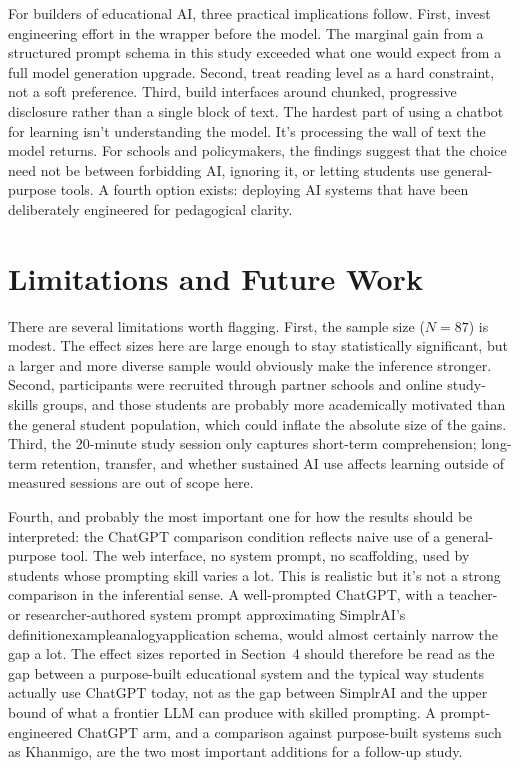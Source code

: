 \documentclass[11pt,letterpaper]{article}
\begin{document}
For builders of educational AI, three practical implications follow. First,
invest engineering effort in the wrapper before the model. The marginal gain
from a structured prompt schema in this study exceeded what one would expect
from a full model generation upgrade. Second, treat reading level as a hard
constraint, not a soft preference. Third, build interfaces around chunked,
progressive disclosure rather than a single block of text. The hardest part of
using a chatbot for learning isn't understanding the model. It's
processing the wall of text the model returns. For schools and policymakers,
the findings suggest that the choice need not be between forbidding AI, ignoring
it, or letting students use general-purpose tools. A fourth option exists:
deploying AI systems that have been deliberately engineered for pedagogical
clarity.


\section{Limitations and Future Work}

There are several limitations worth flagging. First, the sample size ($N = 87$)
is modest. The effect sizes here are large enough to stay statistically
significant, but a larger and more diverse sample would obviously make the
inference stronger. Second, participants were recruited through partner schools
and online study-skills groups, and those students are probably more
academically motivated than the general student population, which could inflate
the absolute size of the gains. Third, the 20-minute study session only
captures short-term comprehension; long-term retention, transfer, and whether
sustained AI use affects learning outside of measured sessions are out of scope
here.

Fourth, and probably the most important one for how the results should be
interpreted: the ChatGPT comparison condition reflects naive use of a
general-purpose tool. The web interface, no system prompt, no scaffolding,
used by students whose prompting skill varies a lot. This is realistic but
it's not a strong comparison in the inferential sense. A well-prompted ChatGPT,
with a teacher- or researcher-authored system prompt approximating SimplrAI's
definition\textendash example\textendash analogy\textendash application schema,
would almost certainly narrow the gap a lot. The effect sizes reported in
Section~4 should therefore be read as the gap between a purpose-built
educational system and the typical way students actually use ChatGPT today,
not as the gap between SimplrAI and the upper bound of what a frontier LLM can
produce with skilled prompting. A prompt-engineered ChatGPT arm, and a
comparison against purpose-built systems such as Khanmigo, are the two most
important additions for a follow-up study.
\end{document}
